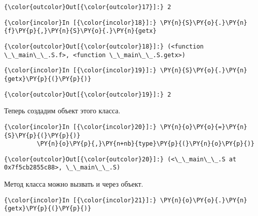             \begin{Verbatim}[commandchars=\\\{\}]
{\color{outcolor}Out[{\color{outcolor}17}]:} 2
\end{Verbatim}
        
    \begin{Verbatim}[commandchars=\\\{\}]
{\color{incolor}In [{\color{incolor}18}]:} \PY{n}{S}\PY{o}{.}\PY{n}{f}\PY{p}{,}\PY{n}{S}\PY{o}{.}\PY{n}{getx}
\end{Verbatim}

            \begin{Verbatim}[commandchars=\\\{\}]
{\color{outcolor}Out[{\color{outcolor}18}]:} (<function \_\_main\_\_.S.f>, <function \_\_main\_\_.S.getx>)
\end{Verbatim}
        
    \begin{Verbatim}[commandchars=\\\{\}]
{\color{incolor}In [{\color{incolor}19}]:} \PY{n}{S}\PY{o}{.}\PY{n}{getx}\PY{p}{(}\PY{p}{)}
\end{Verbatim}

            \begin{Verbatim}[commandchars=\\\{\}]
{\color{outcolor}Out[{\color{outcolor}19}]:} 2
\end{Verbatim}
        
    Теперь создадим объект этого класса.

    \begin{Verbatim}[commandchars=\\\{\}]
{\color{incolor}In [{\color{incolor}20}]:} \PY{n}{o}\PY{o}{=}\PY{n}{S}\PY{p}{(}\PY{p}{)}
         \PY{n}{o}\PY{p}{,}\PY{n+nb}{type}\PY{p}{(}\PY{n}{o}\PY{p}{)}
\end{Verbatim}

            \begin{Verbatim}[commandchars=\\\{\}]
{\color{outcolor}Out[{\color{outcolor}20}]:} (<\_\_main\_\_.S at 0x7f5cb2855c88>, \_\_main\_\_.S)
\end{Verbatim}
        
    Метод класса можно вызвать и через объект.

    \begin{Verbatim}[commandchars=\\\{\}]
{\color{incolor}In [{\color{incolor}21}]:} \PY{n}{o}\PY{o}{.}\PY{n}{getx}\PY{p}{(}\PY{p}{)}
\end{Verbatim}

